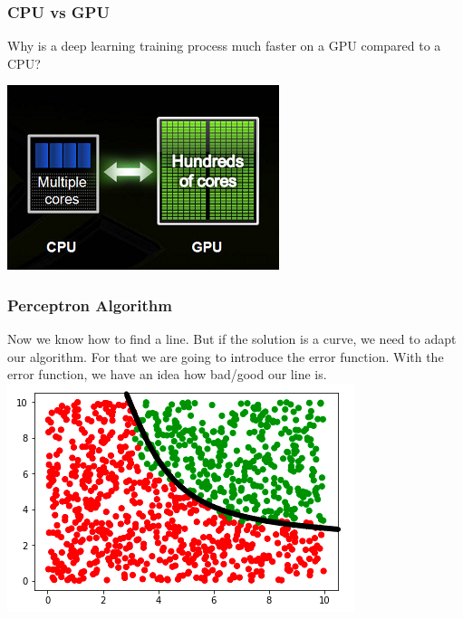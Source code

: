\begin{frame}[fragile]
  \frametitle{CPU vs GPU}
  \begin{exercise}
  Why is a deep learning training process much faster on a GPU compared to a CPU?
  \end{exercise}
  \vspace{3mm}
  \includegraphics[scale=0.4]{img/cpu_gpu}
\end{frame}

\begin{frame}[fragile]
  \frametitle{Perceptron Algorithm}
  Now we know how to find a line. But if the solution is a curve, we need to adapt our
  algorithm. For that we are going to introduce the error function. With the error
  function, we have an idea how bad/good our line is.\\
  \vspace{3mm}
  \includegraphics[scale=0.4]{img/uni_data_1}\\
  \vspace{3mm}
\end{frame}


